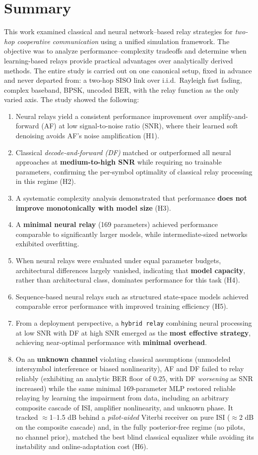 \chapter {Summary}
\noindent
This work examined classical and neural network–based relay strategies for \textit{two-hop cooperative communication} using a unified simulation framework. The objective was to analyze performance–complexity tradeoffs and determine when learning-based relays provide practical advantages over analytically derived methods.
The entire study is carried out on one canonical setup, fixed in advance and never departed from: a two-hop SISO link over i.i.d.\ Rayleigh fast fading, complex baseband, BPSK, uncoded BER, with the relay function as the only varied axis. The study showed the following:
\begin{enumerate}
    \item Neural relays yield a consistent performance improvement over amplify-and-forward (AF) at low signal-to-noise ratio (SNR), where their learned soft denoising avoids AF's noise amplification (H1).
    \item Classical \textit{decode-and-forward (DF)} matched or outperformed all neural approaches at \textbf{medium-to-high SNR} while requiring no trainable parameters, confirming the per-symbol optimality of classical relay processing in this regime (H2).
    \item A systematic complexity analysis demonstrated that performance \textbf{does not improve monotonically with model size} (H3).
    \item A \textbf{minimal neural relay} (169 parameters) achieved performance comparable to significantly larger models, while intermediate-sized networks exhibited overfitting.
    \item When neural relays were evaluated under equal parameter budgets, architectural differences largely vanished, indicating that \textbf{model capacity}, rather than architectural class, dominates performance for this task (H4).
    \item Sequence-based neural relays such as structured state-space models achieved comparable error performance with improved training efficiency (H5).
    \item From a deployment perspective, a \texttt{hybrid relay} combining neural processing at low SNR with DF at high SNR emerged as the \textbf{most effective strategy}, achieving near-optimal performance with \textbf{minimal overhead}.
    \item On an \textbf{unknown channel} violating classical assumptions (unmodeled intersymbol interference or biased nonlinearity), AF and DF failed to relay reliably (exhibiting an analytic BER floor of $0.25$, with DF \emph{worsening} as SNR increased) while the same minimal 169-parameter MLP restored reliable relaying by learning the impairment from data, including an arbitrary composite cascade of ISI, amplifier nonlinearity, and unknown phase. It tracked $\approx$1--1.5 dB behind a \emph{pilot-aided} Viterbi receiver on pure ISI ($\approx$2 dB on the composite cascade) and, in the fully posterior-free regime (no pilots, no channel prior), matched the best blind classical equalizer while avoiding its instability and online-adaptation cost (H6).


\end{enumerate}
